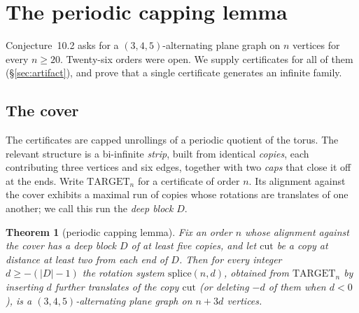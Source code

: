\documentclass[11pt,a4paper]{amsart}
\theoremstyle{plain}
\newtheorem{theorem}{Theorem}[section]
\theoremstyle{definition}
\begin{document}
\section{The periodic capping lemma}\label{sec:pumping}

Conjecture~10.2 asks for a $(3,4,5)$-alternating plane graph on $n$ vertices for
every $n \ge 20$. Twenty-six orders were open. We supply certificates for all of
them (\S\ref{sec:artifact}), and prove that a single certificate generates an
infinite family.

\subsection{The cover}

The certificates are capped unrollings of a periodic quotient of the torus. The
relevant structure is a bi-infinite \emph{strip}, built from identical
\emph{copies}, each contributing three vertices and six edges, together with two
\emph{caps} that close it off at the ends. Write $\mathrm{TARGET}_n$ for a
certificate of order $n$. Its alignment against the cover exhibits a maximal run
of copies whose rotations are translates of one another; we call this run the
\emph{deep block} $D$.

\begin{theorem}[periodic capping lemma]\label{thm:pumping}
Fix an order $n$ whose alignment against the cover has a deep block $D$ of at
least five copies, and let $\mathrm{cut}$ be a copy at distance at least two
from each end of $D$. Then for every integer $d \ge -(|D| - 1)$ the rotation
system $\mathrm{splice}(n,d)$, obtained from $\mathrm{TARGET}_n$ by inserting
$d$ further translates of the copy $\mathrm{cut}$ (or deleting $-d$ of them when
$d < 0$), is a $(3,4,5)$-alternating plane graph on $n + 3d$ vertices.
\end{theorem}
\end{document}
